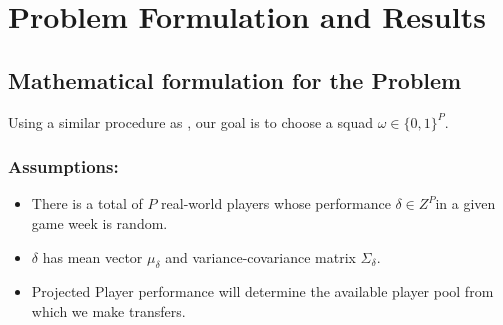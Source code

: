 \documentclass[12pt,oneside,a4paper]{book}
\theoremstyle{definition}
\theoremstyle{remark}
\begin{document}
		\chapter{Problem Formulation and Results} \label{chap:formulation}
			\section{Mathematical formulation for the Problem}
			Using a similar procedure as \cite{haugh2021play}, our goal is to choose a squad   $\omega \in \{0,1\}^P$.

				\subsection{Assumptions:}
					\begin{itemize}
						\item There is a total of $P$ real-world players whose performance   $\delta \in Z^P$in a given game week is random.
						\item $\delta$ has mean vector $\mu_{\delta}$ and variance-covariance matrix $\Sigma_{\delta}$.
						\item Projected Player performance will determine the available player pool from which we make transfers.
					\end{itemize}
\end{document}
